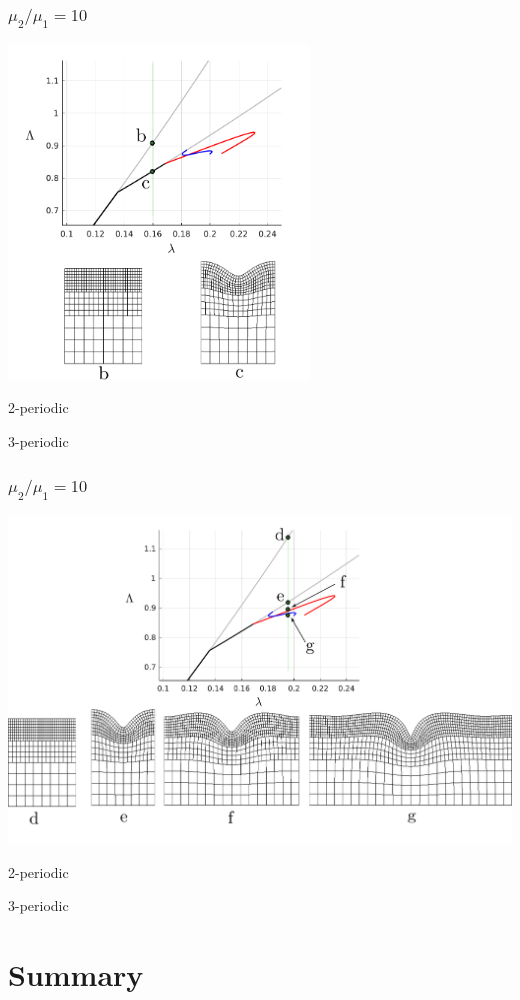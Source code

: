 \documentclass{beamer}
\begin{document}
\begin{frame}
	\frametitle{$ \mu_2 / \mu_1 = 10$}
	\begin{center}
	\includegraphics[width = 0.6\textwidth]{myFigures/slice2}
	\end{center}
	\color{red} 2-periodic 
	
	\color{blue} 3-periodic
\end{frame}

\begin{frame}
	\frametitle{$ \mu_2 / \mu_1 = 10$}
	\begin{center}
	\includegraphics[width = \textwidth]{myFigures/slice3}
	\end{center}
	
	\color{red} 2-periodic 
	
	\color{blue} 3-periodic
\end{frame}

\section{Summary}
\end{document}
